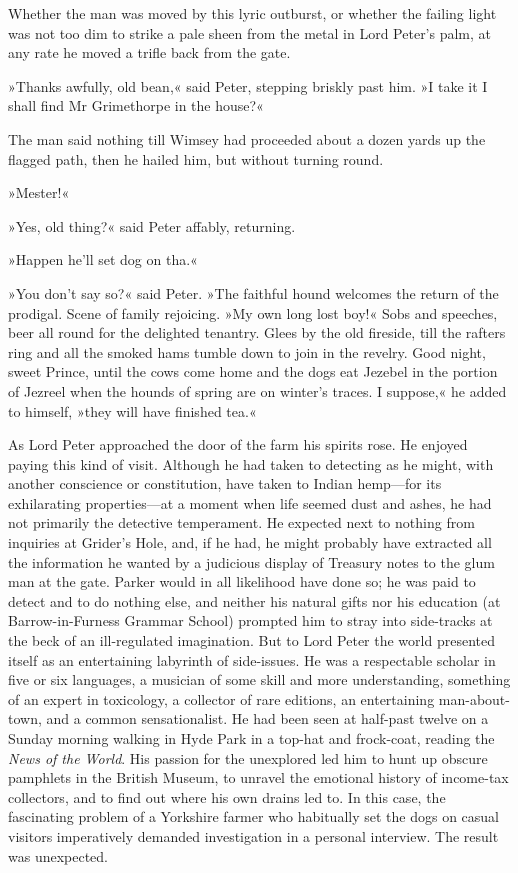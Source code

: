 Whether the man was moved by this lyric outburst, or whether the failing light was not too dim to strike a pale sheen from the metal in Lord Peter's palm, at any rate he moved a trifle back from the gate.

»Thanks awfully, old bean,« said Peter, stepping briskly past him. »I take it I shall find Mr Grimethorpe in the house?«

The man said nothing till Wimsey had proceeded about a dozen yards up the flagged path, then he hailed him, but without turning round.

»Mester!«

»Yes, old thing?« said Peter affably, returning.

»Happen he'll set dog on tha.«

»You don't say so?« said Peter. »The faithful hound welcomes the return of the prodigal. Scene of family rejoicing. »My own long lost boy!« Sobs and speeches, beer all round for the delighted tenantry. Glees by the old fireside, till the rafters ring and all the smoked hams tumble down to join in the revelry. Good night, sweet Prince, until the cows come home and the dogs eat Jezebel in the portion of Jezreel when the hounds of spring are on winter's traces. I suppose,« he added to himself, »they will have finished tea.«

As Lord Peter approached the door of the farm his spirits rose. He enjoyed paying this kind of visit. Although he had taken to detecting as he might, with another conscience or constitution, have taken to Indian hemp—for its exhilarating properties—at a moment when life seemed dust and ashes, he had not primarily the detective temperament.  He expected next to nothing from inquiries at Grider's Hole, and, if he had, he might probably have extracted all the information he wanted by a judicious display of Treasury notes to the glum man at the gate. Parker would in all likelihood have done so; he was paid to detect and to do nothing else, and neither his natural gifts nor his education (at Barrow-in-Furness Grammar School) prompted him to stray into side-tracks at the beck of an ill-regulated imagination. But to Lord Peter the world presented itself as an entertaining labyrinth of side-issues. He was a respectable scholar in five or six languages, a musician of some skill and more understanding, something of an expert in toxicology, a collector of rare editions, an entertaining man-about-town, and a common sensationalist. He had been seen at half-past twelve on a Sunday morning walking in Hyde Park in a top-hat and frock-coat, reading the \textit{News of the World}. His passion for the unexplored led him to hunt up obscure pamphlets in the British Museum, to unravel the emotional history of income-tax collectors, and to find out where his own drains led to. In this case, the fascinating problem of a Yorkshire farmer who habitually set the dogs on casual visitors imperatively demanded investigation in a personal interview. The result was unexpected.

